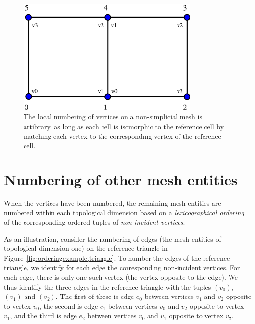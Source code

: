 \begin{figure}[htbp]
  \begin{center}
    \includegraphics[width=9cm]{eps/numbering_example_quadrilaterals.eps}
    \caption{The local numbering of vertices on a non-simplicial mesh
      is artibrary, as long as each cell is isomorphic to the
      reference cell by matching each vertex to the corresponding
      vertex of the reference cell.}
    \label{fig:numbering_example_quadrilaterals}
  \end{center}
\end{figure}

\section{Numbering of other mesh entities}

When the vertices have been numbered, the remaining mesh entities are
numbered within each topological dimension based on a
\emph{lexicographical ordering} of the corresponding ordered tuples of
\emph{non-incident vertices}.

As an illustration, consider the numbering of edges (the mesh entities
of topological dimension one) on the reference triangle in
Figure~\ref{fig:orderingexample,triangle}. To number the edges of the
reference triangle, we identify for each edge the corresponding
non-incident vertices. For each edge, there is only one such vertex
(the vertex opposite to the edge). We thus identify the three edges in
the reference triangle with the tuples $(v_0)$, $(v_1)$ and $(v_2)$. The
first of these is edge $e_0$ between vertices $v_1$ and $v_2$ opposite
to vertex $v_0$, the second is edge $e_1$ between vertices $v_0$ and
$v_2$ opposite to vertex $v_1$, and the third is edge $e_2$ between
vertices $v_0$ and $v_1$ opposite to vertex $v_2$.

